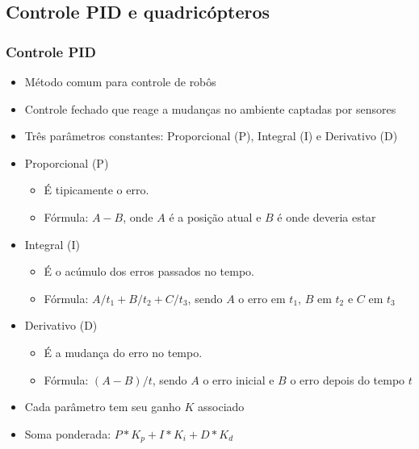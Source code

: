 \documentclass{beamer}
\begin{document}
\subsection{Controle PID e quadricópteros}
\begin{frame}[allowframebreaks]
	
	\frametitle{Controle PID}
	\begin{itemize}
	
		\item Método comum para controle de robôs
		
		\item Controle fechado que reage a mudanças no ambiente captadas por sensores
		
		\item Três parâmetros constantes: Proporcional (P), Integral (I) e Derivativo (D)
		
	\framebreak
	
		\item Proporcional (P)
			\begin{itemize}
				\item É tipicamente o erro. 
				\item Fórmula: $A - B$, onde $A$ é a posição atual e $B$ é onde deveria estar 	
			\end{itemize}
			
		\item Integral (I)
		\begin{itemize}
			\item É o acúmulo dos erros passados no tempo. 
			\item Fórmula: $A/t_1 + B/t_2 + C/t_3$, sendo $A$ o erro em $t_1$, $B$ em $t_2$ e $C$ em $t_3$ 	
		\end{itemize}	
		
		\item Derivativo (D)
		\begin{itemize}
			\item É a mudança do erro no tempo. 
			\item Fórmula: $(A-B)/t$, sendo $A$ o erro inicial e $B$ o erro depois do tempo $t$ 	
		\end{itemize}	
		
	\framebreak
	
		\item Cada parâmetro tem seu ganho $K$ associado
		
		\vspace{2pt}
		
		\item Soma ponderada: $P*K_p + I*K_i + D*K_d$
		

\end{itemize}
\end{frame}
\end{document}
